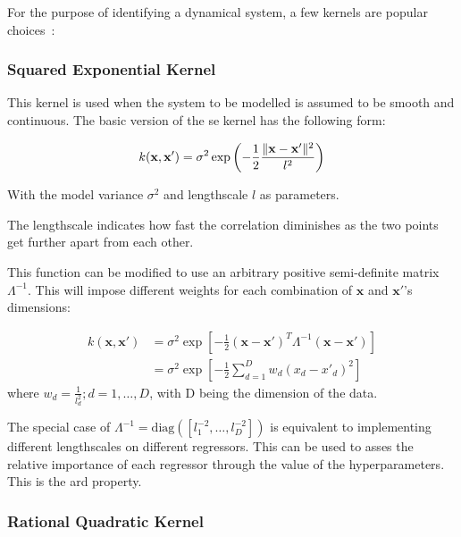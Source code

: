 For the purpose of identifying a dynamical system, a few kernels are popular
choices~\cite{kocijanModellingControlDynamic2016}: 


\subsubsection*{Squared Exponential Kernel}

This kernel is used when the system to be modelled is assumed to be smooth and
continuous. The basic version of the \acrshort{se} kernel has the following form:

\begin{equation}
    k(\mathbf{x}, \mathbf{x'}) = \sigma^2 \exp{\left(- \frac{1}{2}\frac{\lVert\mathbf{x} -
    \mathbf{x'}\rVert^2}{l^2}\right)}
\end{equation}

With the model variance $\sigma^2$ and lengthscale $l$ as parameters.

The lengthscale indicates how fast the correlation diminishes as the two points
get further apart from each other.

This function can be modified to use an arbitrary positive semi-definite matrix
$\Lambda^{-1}$.
This will impose different weights for each combination of $\mathbf{x}$ and
$\mathbf{x'}$'s dimensions:

\begin{equation}
    \begin{aligned}
        k(\mathbf{x}, \mathbf{x'})
        &= \sigma^2\exp{\left[-\frac{1}{2} (\mathbf{x} - \mathbf{x'})^T \Lambda^{-1}
        (\mathbf{x} - \mathbf{x'})\right]} \\
        &= \sigma^2 \exp{\left[-\frac{1}{2}\sum_{d=1}^D w_d(x_d - x'_d)^2\right]}
    \end{aligned}
\end{equation}
where $w_d = \frac{1}{l_d^2}; d = 1 ,\dots, D$, with D being the dimension of the
data.

The special case of $\Lambda^{-1} = \text{diag}{\left([l_1^{-2},\dots,l_D^{-2}]\right)}$
is equivalent to implementing different lengthscales on different regressors.
This can be used to asses the relative importance of each regressor through the
value of the hyperparameters. This is the \acrfull{ard} property.


\subsubsection*{Rational Quadratic Kernel}

